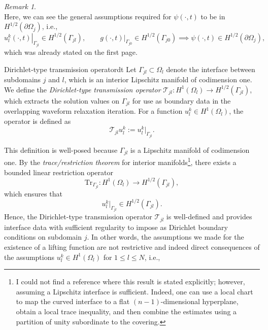 \documentclass[a4paper, 11pt]{article}
\theoremstyle{remark}
\newtheorem{remark}[equation]{Remark}
\begin{document}
\begin{remark}
\begin{equation*}
    \end{equation*}
    Here, we can see the general assumptions required for $\psi(\cdot, t)$ to be in $H^{1/2}(\partial\Omega_{j})$, i.e.,
    \begin{equation*}
        \left.u_{l}^{k}(\cdot, t)\right|_{\Gamma_{jl}} \in H^{1/2}(\Gamma_{jl}), \qquad \left.g(\cdot, t)\right|_{\Gamma_{j0}} \in H^{1/2}(\Gamma_{j0}) \implies \psi(\cdot, t)\in H^{1/2}(\partial\Omega_{j}),
    \end{equation*}
    which was already stated on the first page.
\end{remark}

\begin{definition}{Dirichlet-type transmission operator}{dt}
    Let $\Gamma_{jl} \subset \Omega_l$ denote the interface between subdomains $j$ and $l$, which is an interior Lipschitz manifold of codimension one. We define the \emph{Dirichlet-type transmission operator} $\mathcal{T}_{jl}: H^1(\Omega_l) \to H^{1/2}(\Gamma_{jl})$, which extracts the solution values on $\Gamma_{jl}$ for use as boundary data in the overlapping waveform relaxation iteration. For a function $u_l^k \in H^1(\Omega_l)$, the operator is defined as
    \begin{equation*}
        \mathcal{T}_{jl} u_l^k := u_l^k|_{\Gamma_{jl}}.
    \end{equation*}
\end{definition}
This definition is well-posed because $\Gamma_{jl}$ is a Lipschitz manifold of codimension one. By the \emph{trace/restriction theorem} for interior manifolds\footnote{I could not find a reference where this result is stated explicitly; however, assuming a Lipschitz interface is sufficient. Indeed, one can use a local chart to map the curved interface to a flat $(n-1)$-dimensional hyperplane, obtain a local trace inequality, and then combine the estimates using a partition of unity subordinate to the covering.}, there exists a bounded linear restriction operator
\begin{equation*}
    \text{Tr}_{\Gamma_{jl}}: H^1(\Omega_l) \to H^{1/2}(\Gamma_{jl}),
\end{equation*}
which ensures that
\begin{equation*}
    u_l^k|_{\Gamma_{jl}} \in H^{1/2}(\Gamma_{jl}).
\end{equation*}
Hence, the Dirichlet-type transmission operator $\mathcal{T}_{jl}$ is well-defined and provides interface data with sufficient regularity to impose as Dirichlet boundary conditions on subdomain $j$. In other words, the assumptions we made for the existence of a lifting function are not restrictive and indeed direct consequences of the assumptions $u_l^k \in H^1(\Omega_l)$ for $1\leq l \leq N$, i.e.,
\end{document}
